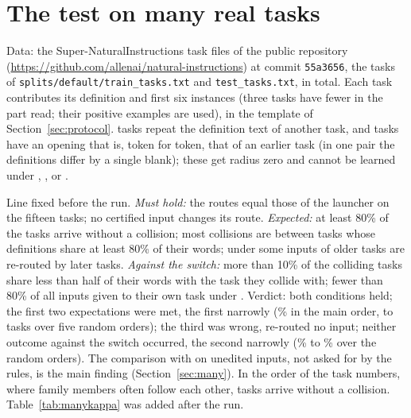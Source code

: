 \begin{table}[h]
  \caption{The mechanical edit test by task, ordered by the length $n_k$ of the opening in tokens.
  $100\,R_k/D$: the share of the weight of the opening, in per cent, that an edit may remove and add
  without any possibility of leaving the zone (Proposition~\ref{prop:edits}). ``drop.'' and
  ``repl.'': dropped and replaced words.}
  \label{tab:editspertask}
  \centering
  \footnotesize
  \setlength{\tabcolsep}{4pt}
  
\end{table}

\FloatBarrier
\section{The test on many real tasks}
\label{app:many}

Data: the Super-NaturalInstructions task files of the public repository (\url{https://github.com/allenai/natural-instructions}) at commit \texttt{55a3656}, the tasks of \texttt{splits/default/train\_tasks.txt} and \texttt{test\_tasks.txt}, \ManyTasks{} in total. Each task contributes its definition and first six instances (three tasks have fewer in the part read; their positive examples are used), in the template of Section~\ref{sec:protocol}. \ManySamePairs{} tasks repeat the definition text of another task, and \ManyZeroRadius{} tasks have an opening that is, token for token, that of an earlier task (in one pair the definitions differ by a single blank); these get radius zero and cannot be learned under \cert{}, \exactfirst{}, \nearest{} or \keyswitch{}.

Line fixed before the run. \emph{Must hold:} the routes equal those of the launcher on the fifteen tasks; no certified input changes its route. \emph{Expected:} at least 80\% of the tasks arrive without a collision; most collisions are between tasks whose definitions share at least 80\% of their words; under \nearest{} some inputs of older tasks are re-routed by later tasks. \emph{Against the switch:} more than 10\% of the colliding tasks share less than half of their words with the task they collide with; fewer than 80\% of all inputs given to their own task under \cert{}.
Verdict: both conditions held; the first two expectations were met, the first narrowly (\ManyCleanPct{}\% in the main order, \ManyCleanLow{} to \ManyCleanHigh{} tasks over five random orders); the third was wrong, \nearest{} re-routed no input; neither outcome against the switch occurred, the second narrowly (\ManyCertRightPctLow{}\% to \ManyCertRightPctHigh{}\% over the random orders). The comparison with \nearest{} on unedited inputs, not asked for by the rules, is the main finding (Section~\ref{sec:many}). In the order of the task numbers, where family members often follow each other, \ManyNumericClean{} tasks arrive without a collision. Table~\ref{tab:manykappa} was added after the run.

